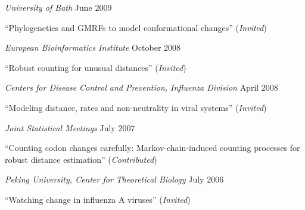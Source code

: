 \documentclass[10pt]{article}
\newenvironment{outerlist}[1][\enskip\textbullet]%
        {\begin{itemize}[#1]}{\end{itemize}%
         \vspace{-.6\baselineskip}}
\newenvironment{innerlist}[1][\enskip\textbullet]%
        {\begin{compactitem}[#1]}{\end{compactitem}}
\begin{document}
\begin{outerlist}
\item[] \textit{University of Bath}%
        \hfill {June 2009}
\begin{innerlist}
\item ``Phylogenetics and GMRFs to model conformational changes'' (\emph{Invited})
\end{innerlist}
\end{outerlist} 

\begin{outerlist}
\item[] \textit{European Bioinformatics Institute }%
        \hfill {October 2008}
\begin{innerlist}
\item ``Robust counting for unusual distances''  (\emph{Invited})
\end{innerlist}
\end{outerlist} 

\begin{outerlist}
\item[] \textit{Centers for Disease Control and Prevention, Influenza Division}%
        \hfill {April 2008}
\begin{innerlist}
\item ``Modeling distance, rates and non-neutrality in viral systems''  (\emph{Invited})
\end{innerlist}
\end{outerlist} 


\begin{outerlist}
\item[] \textit{Joint Statistical Meetings}%
        \hfill {July 2007}
\begin{innerlist}
\item ``Counting codon changes carefully: Markov-chain-induced counting processes for robust distance estimation'' (\emph{Contributed})
\end{innerlist}
\end{outerlist}

\begin{outerlist}
\item[] \textit{Peking University, Center for Theoretical Biology}%
        \hfill {July 2006}
\begin{innerlist}
\item ``Watching change in influenza A viruses'' (\emph{Invited})
\end{innerlist}
\end{outerlist} 
\end{document}
